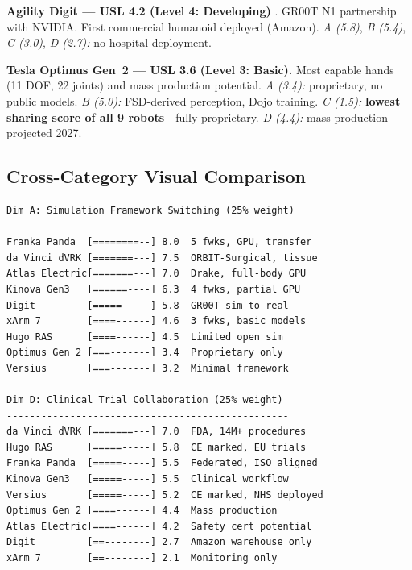 \textbf{Agility Digit --- USL 4.2 (Level 4: Developing)} \cite{digit2024}. GR00T N1 \cite{groot2026} partnership with NVIDIA. First commercial humanoid deployed (Amazon). \textit{A (5.8)}, \textit{B (5.4)}, \textit{C (3.0)}, \textit{D (2.7):} no hospital deployment.

\textbf{Tesla Optimus Gen~2 --- USL 3.6 (Level 3: Basic).} Most capable hands (11 DOF, 22 joints) and mass production potential. \textit{A (3.4):} proprietary, no public models. \textit{B (5.0):} FSD-derived perception, Dojo training. \textit{C (1.5):} \textbf{lowest sharing score of all 9 robots}---fully proprietary. \textit{D (4.4):} mass production projected 2027.

\subsection{Cross-Category Visual Comparison}
\begin{lstlisting}[language={},basicstyle=\ttfamily\scriptsize,numbers=none,caption={Dimension A and D scores across all nine robots}]
Dim A: Simulation Framework Switching (25% weight)
--------------------------------------------------
Franka Panda  [========--] 8.0  5 fwks, GPU, transfer
da Vinci dVRK [=======---] 7.5  ORBIT-Surgical, tissue
Atlas Electric[=======---] 7.0  Drake, full-body GPU
Kinova Gen3   [======----] 6.3  4 fwks, partial GPU
Digit         [=====-----] 5.8  GR00T sim-to-real
xArm 7        [====------] 4.6  3 fwks, basic models
Hugo RAS      [====------] 4.5  Limited open sim
Optimus Gen 2 [===-------] 3.4  Proprietary only
Versius       [===-------] 3.2  Minimal framework

Dim D: Clinical Trial Collaboration (25% weight)
-------------------------------------------------
da Vinci dVRK [=======---] 7.0  FDA, 14M+ procedures
Hugo RAS      [=====-----] 5.8  CE marked, EU trials
Franka Panda  [=====-----] 5.5  Federated, ISO aligned
Kinova Gen3   [=====-----] 5.5  Clinical workflow
Versius       [=====-----] 5.2  CE marked, NHS deployed
Optimus Gen 2 [====------] 4.4  Mass production
Atlas Electric[====------] 4.2  Safety cert potential
Digit         [==--------] 2.7  Amazon warehouse only
xArm 7        [==--------] 2.1  Monitoring only
\end{lstlisting}

